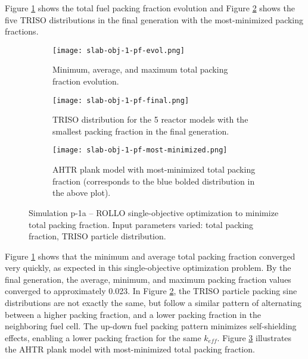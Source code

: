 Figure \ref{fig:slab-obj-1-pf-evol} shows the total fuel packing fraction evolution and 
Figure \ref{fig:slab-obj-1-pf-final} shows the five TRISO distributions in 
the final generation with the most-minimized packing fractions. 
\begin{figure}[htbp!]
    \centering
    \begin{subfigure}{0.95\textwidth}
        \texttt{[image: slab-obj-1-pf-evol.png]}
        \caption{Minimum, average, and maximum total packing fraction evolution.}
        \label{fig:slab-obj-1-pf-evol} 
    \end{subfigure}
    \begin{subfigure}{0.95\textwidth}
        \texttt{[image: slab-obj-1-pf-final.png]}
        \caption{TRISO distribution for the 5 reactor models with the 
        smallest packing fraction in the final generation.}
        \label{fig:slab-obj-1-pf-final} 
    \end{subfigure}
    \begin{subfigure}{0.95\textwidth}
        \texttt{[image: slab-obj-1-pf-most-minimized.png]}
        \caption{\gls{AHTR} plank model with most-minimized total packing fraction 
        (corresponds to the blue bolded distribution in the above plot).}
        \label{fig:slab-obj-1-pf-most-minimized} 
    \end{subfigure}
    \caption{Simulation p-1a -- ROLLO single-objective optimization to minimize total 
    packing fraction. Input parameters varied: total packing fraction, TRISO particle 
    distribution.}
    \label{fig:slab-obj-1-pf}
\end{figure}
Figure \ref{fig:slab-obj-1-pf-evol} shows that the minimum and average total packing 
fraction converged very quickly, as expected in this single-objective optimization 
problem.
By the final generation, the average, minimum, and maximum packing fraction
values converged to approximately 0.023. 
In Figure \ref{fig:slab-obj-1-pf-final}, the TRISO particle packing 
sine distributions are not exactly the same, but follow a similar pattern of 
alternating between a higher packing fraction, and a lower packing fraction 
in the neighboring fuel cell. 
The up-down fuel packing pattern minimizes self-shielding effects, enabling  
a lower packing fraction for the same $k_{eff}$. 
Figure \ref{fig:slab-obj-1-pf-most-minimized} illustrates the \gls{AHTR} plank model 
with most-minimized total packing fraction.

